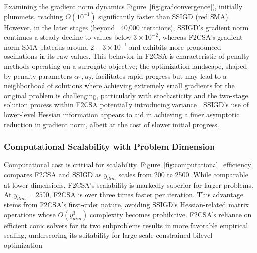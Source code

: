 \documentclass[letterpaper]{article} %
\newcommand{\1}{\mathbf{1}}
\begin{document}
Examining the gradient norm dynamics Figure~\ref{fig:gradconvergence}), initially plummets, reaching $O(10^{-1})$ significantly faster than SSIGD (red SMA). However, in the later stages (beyond ~40,000 iterations), SSIGD's gradient norm continues a steady decline to values below $3 \times 10^{-2}$, whereas F2CSA's gradient norm SMA plateaus around $2-3 \times 10^{-1}$ and exhibits more pronounced oscillations in its raw values. This behavior in F2CSA is characteristic of penalty methods operating on a surrogate objective; the optimization landscape, shaped by penalty parameters $\alpha_1, \alpha_2$, facilitates rapid progress but may lead to a neighborhood of solutions where achieving extremely small gradients for the original problem is challenging, particularly with stochasticity and the two-stage solution process within F2CSA potentially introducing variance \cite{ghadimi2018approximation}. SSIGD's use of lower-level Hessian information appears to aid in achieving a finer asymptotic reduction in gradient norm, albeit at the cost of slower initial progress.

\subsubsection{Computational Scalability with Problem Dimension}
\label{sec:exp_scalability}
Computational cost is critical for scalability. Figure~\ref{fig:computational_efficiency} compares F2CSA and SSIGD as $y_{dim}$ scales from 200 to 2500. While comparable at lower dimensions, F2CSA's scalability is markedly superior for larger problems. At $y_{dim}=2500$, F2CSA is over three times faster per iteration. This advantage stems from F2CSA's first-order nature, avoiding SSIGD's Hessian-related matrix operations whose $O(y_{dim}^3)$ complexity becomes prohibitive. F2CSA's reliance on efficient conic solvers for its two subproblems results in more favorable empirical scaling, underscoring its suitability for large-scale constrained bilevel optimization.
\end{document}

